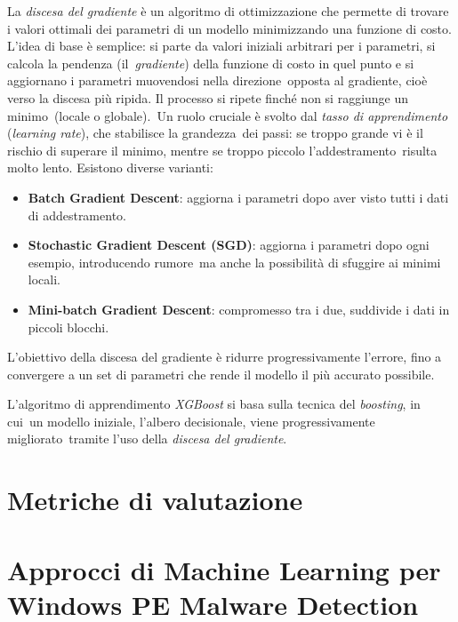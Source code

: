 La \textit{discesa del gradiente} è un algoritmo di ottimizzazione che permette di trovare i valori ottimali dei
parametri di un modello minimizzando una funzione di costo.
L'idea di base è semplice: si parte da valori iniziali arbitrari per i parametri, si calcola la pendenza (il\
\textit{gradiente}) della funzione di costo in quel punto e si aggiornano i parametri muovendosi nella direzione\
opposta al gradiente, cioè verso la discesa più ripida. Il processo si ripete finché non si raggiunge un minimo\
(locale o globale).\
Un ruolo cruciale è svolto dal \textit{tasso di apprendimento} (\textit{learning rate}), che stabilisce la grandezza\
dei passi: se troppo grande vi è il rischio di superare il minimo, mentre se troppo piccolo l'addestramento\
risulta molto lento. Esistono diverse varianti:\
\begin{itemize}
      \item \textbf{Batch Gradient Descent}: aggiorna i parametri dopo aver visto tutti i dati di addestramento.
      \item \textbf{Stochastic Gradient Descent (SGD)}: aggiorna i parametri dopo ogni esempio, introducendo rumore\
            ma anche la possibilità di sfuggire ai minimi locali.
      \item \textbf{Mini-batch Gradient Descent}: compromesso tra i due, suddivide i dati in piccoli blocchi.
\end{itemize}

L'obiettivo della discesa del gradiente è ridurre progressivamente l'errore, fino a convergere a un set di
parametri che rende il modello il più accurato possibile.

L'algoritmo di apprendimento \textit{XGBoost} si basa sulla tecnica del \textit{boosting}, in cui\
un modello iniziale, l'albero decisionale, viene progressivamente migliorato\
tramite l'uso della \textit{discesa del gradiente}.

\section{Metriche di valutazione}


\section{Approcci di Machine Learning per Windows PE Malware Detection}
